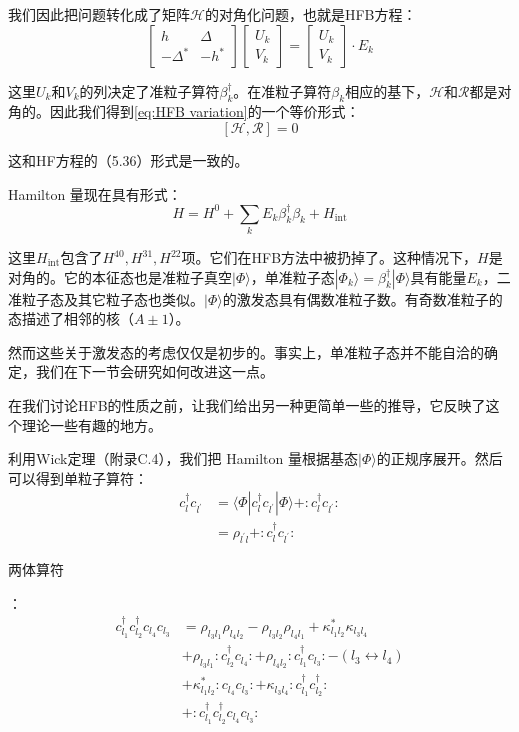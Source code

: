 我们因此把问题转化成了矩阵$\mathcal{H}$的对角化问题，也就是HFB方程：
\begin{equation}
\begin{bmatrix}h & \Delta\\
-\Delta^{*} & -h^{*}
\end{bmatrix}\begin{bmatrix}U_{k}\\
V_{k}
\end{bmatrix}=\begin{bmatrix}U_{k}\\
V_{k}
\end{bmatrix}\cdot E_{k}\label{eq:HFB equation}
\end{equation}

这里$U_{k}$和$V_{k}$的列决定了准粒子算符$\beta^{\dagger}_{k}$。在准粒子算符$\beta_{k}$相应的基下，$\mathcal{H}$和$\mathcal{R}$都是对角的。因此我们得到\ref{eq:HFB variation}的一个等价形式\cite{BS59}：
\[
[\mathcal{H},\mathcal{R}]=0
\]

这和HF方程的（5.36）形式是一致的。

Hamilton 量现在具有形式：
\[
H=H^{0}+\sum_{k}E_{k}\beta^{\dagger}_{k}\beta_{k}+H_{\text{int}}
\]

这里$H_{\text{int}}$包含了$H^{40},H^{31},H^{22}$项。它们在HFB方法中被扔掉了。这种情况下，$H$是对角的。它的本征态也是准粒子真空$|\Phi\rangle$，单准粒子态$|\Phi_{k}\rangle=\beta^{\dagger}_{k}|\Phi\rangle$具有能量$E_{k}$，二准粒子态及其它粒子态也类似。$|\Phi\rangle$的激发态具有偶数准粒子数。有奇数准粒子的态描述了相邻的核（$A\pm1$）。

然而这些关于激发态的考虑仅仅是初步的。事实上，单准粒子态并不能自洽的确定，我们在下一节会研究如何改进这一点。

在我们讨论HFB的性质之前，让我们给出另一种更简单一些的推导，它反映了这个理论一些有趣的地方。

利用Wick定理（附录C.4），我们把 Hamilton 量根据基态$|\Phi\rangle$的正规序展开。然后可以得到单粒子算符：
\begin{align*}
c^{\dagger}_{l}c_{l^{\prime}} & =\langle\Phi|c^{\dagger}_{l}c_{l^{\prime}}|\Phi\rangle+:\mathrel{c^{\dagger}_{l}c_{l^{\prime}}}:\\
 & =\rho_{l^{\prime}l}+:\mathrel{c^{\dagger}_{l}c_{l^{\prime}}}:
\end{align*}

两体算符

：
\begin{align*}
c^{\dagger}_{l_{1}}c^{\dagger}_{l_{2}}c_{l_{4}}c_{l_{3}} & =\rho_{l_{3}l_{1}}\rho_{l_{4}l_{2}}-\rho_{l_{3}l_{2}}\rho_{l_{4}l_{1}}+\kappa^{*}_{l_{1}l_{2}}\kappa_{l_{3}l_{4}}\\
 & +\rho_{l_{3}l_{1}}:\mathrel{c^{\dagger}_{l_{2}}c_{l_{4}}}:+\rho_{l_{4}l_{2}}:\mathrel{c^{\dagger}_{l_{1}}c_{l_{3}}}:-(l_{3}\leftrightarrow l_{4})\\
 & +\kappa^{*}_{l_{1}l_{2}}:\mathrel{c_{l_{4}}c_{l_{3}}}:+\kappa_{l_{3}l_{4}}:\mathrel{c^{\dagger}_{l_{1}}c^{\dagger}_{l_{2}}}:\\
 & +:\mathrel{c^{\dagger}_{l_{1}}c^{\dagger}_{l_{2}}c_{l_{4}}c_{l_{3}}}:
\end{align*}

